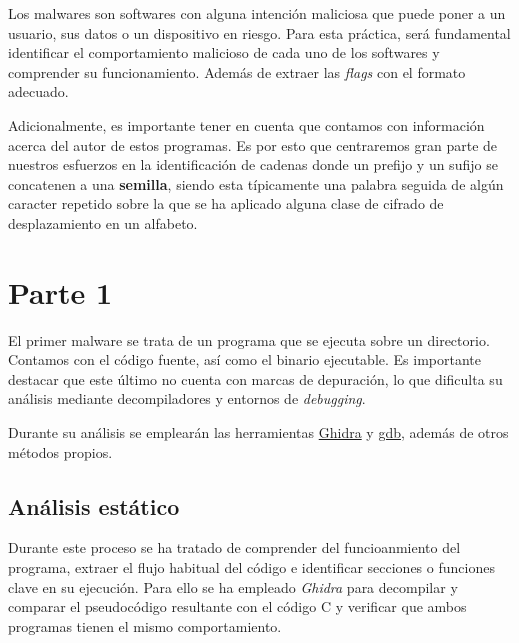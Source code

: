 \documentclass[]{article}
\begin{document}
Los malwares son softwares con alguna intención maliciosa que puede poner a un
usuario, sus datos o un dispositivo en riesgo. Para esta práctica, será
fundamental identificar el comportamiento malicioso de cada uno de los
softwares y comprender su funcionamiento. Además de extraer las \textit{flags}
con el formato adecuado.

Adicionalmente, es importante tener en cuenta que contamos con información
acerca del autor de estos programas. Es por esto que centraremos gran parte de
nuestros esfuerzos en la identificación de cadenas donde un prefijo y un sufijo
se concatenen a una \textbf{semilla}, siendo esta típicamente una palabra
seguida de algún caracter repetido sobre la que se ha aplicado alguna clase de
cifrado de desplazamiento en un alfabeto.

\section{Parte 1}
\label{sec:type1}
El primer malware se trata de un programa que se ejecuta sobre un directorio.
Contamos con el código fuente, así como el binario ejecutable. Es importante
destacar que este último no cuenta con marcas de depuración, lo que dificulta
su análisis mediante decompiladores y entornos de \textit{debugging}.

Durante su análisis se emplearán las herramientas
\href{https://ghidra-sre.org/}{Ghidra} y
\href{https://man7.org/linux/man-pages/man1/gdb.1.html}{gdb}, además de otros
métodos propios.

\subsection{Análisis estático}
\label{subsec:analisis-estatico-1}

Durante este proceso se ha tratado de comprender del funcioanmiento del
programa, extraer el flujo habitual del código e identificar secciones o
funciones clave en su ejecución. Para ello se ha empleado \textit{Ghidra} 
para decompilar y comparar el pseudocódigo resultante con el código C y
verificar que ambos programas tienen el mismo comportamiento.
\end{document}
